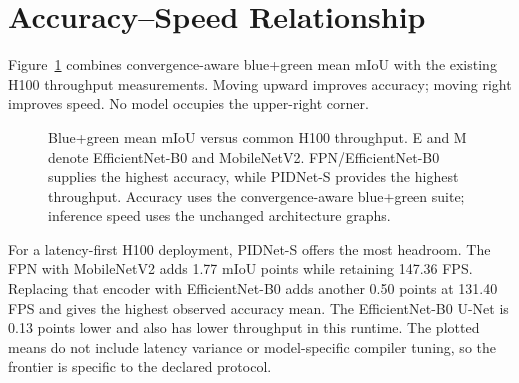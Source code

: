 \section{Accuracy--Speed Relationship}

Figure~\ref{fig:accuracy_speed_h100} combines convergence-aware blue+green mean
mIoU with the existing H100 throughput measurements. Moving upward improves
accuracy; moving right improves speed. No model occupies the upper-right
corner.

\begin{figure}[H]
\centering
{}
\caption[Blue+green accuracy versus H100 throughput.]{Blue+green mean mIoU
versus common H100 throughput. E and M denote EfficientNet-B0 and
MobileNetV2. FPN/EfficientNet-B0 supplies the highest accuracy, while PIDNet-S
provides the highest throughput. Accuracy uses the convergence-aware
blue+green suite; inference speed uses the unchanged architecture graphs.}
\label{fig:accuracy_speed_h100}
\end{figure}

For a latency-first H100 deployment, PIDNet-S offers the most headroom. The FPN
with MobileNetV2 adds 1.77 mIoU points while retaining 147.36 FPS. Replacing
that encoder with EfficientNet-B0 adds another 0.50 points at 131.40 FPS and
gives the highest observed accuracy mean. The EfficientNet-B0 U-Net is 0.13
points lower and also has lower throughput in this runtime. The plotted means
do not include latency variance or model-specific compiler tuning, so the
frontier is specific to the declared protocol.

